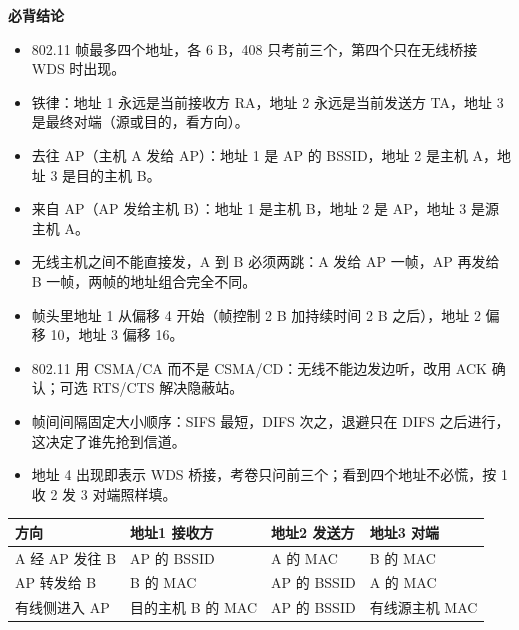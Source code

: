 \documentclass[10pt,a4paper]{ctexart}
\begin{document}



\textbf{必背结论}

\begin{itemize}

\item 802.11 帧最多四个地址，各 6 B，408 只考前三个，第四个只在无线桥接 WDS 时出现。

\item 铁律：地址 1 永远是当前接收方 RA，地址 2 永远是当前发送方 TA，地址 3 是最终对端（源或目的，看方向）。

\item 去往 AP（主机 A 发给 AP）：地址 1 是 AP 的 BSSID，地址 2 是主机 A，地址 3 是目的主机 B。

\item 来自 AP（AP 发给主机 B）：地址 1 是主机 B，地址 2 是 AP，地址 3 是源主机 A。

\item 无线主机之间不能直接发，A 到 B 必须两跳：A 发给 AP 一帧，AP 再发给 B 一帧，两帧的地址组合完全不同。

\item 帧头里地址 1 从偏移 4 开始（帧控制 2 B 加持续时间 2 B 之后），地址 2 偏移 10，地址 3 偏移 16。

\item 802.11 用 CSMA/CA 而不是 CSMA/CD：无线不能边发边听，改用 ACK 确认；可选 RTS/CTS 解决隐蔽站。

\item 帧间间隔固定大小顺序：SIFS 最短，DIFS 次之，退避只在 DIFS 之后进行，这决定了谁先抢到信道。

\item 地址 4 出现即表示 WDS 桥接，考卷只问前三个；看到四个地址不必慌，按 1 收 2 发 3 对端照样填。

\end{itemize}

\begin{center}\small
\begin{tabularx}{\linewidth}{@{}l>{\raggedright\arraybackslash}Xll@{}}
\toprule
方向 & 地址1 接收方 & 地址2 发送方 & 地址3 对端 \\
\midrule
A 经 AP 发往 B & AP 的 BSSID & A 的 MAC & B 的 MAC \\
AP 转发给 B & B 的 MAC & AP 的 BSSID & A 的 MAC \\
有线侧进入 AP & 目的主机 B 的 MAC & AP 的 BSSID & 有线源主机 MAC \\
\bottomrule
\end{tabularx}
\end{center}
\end{document}
